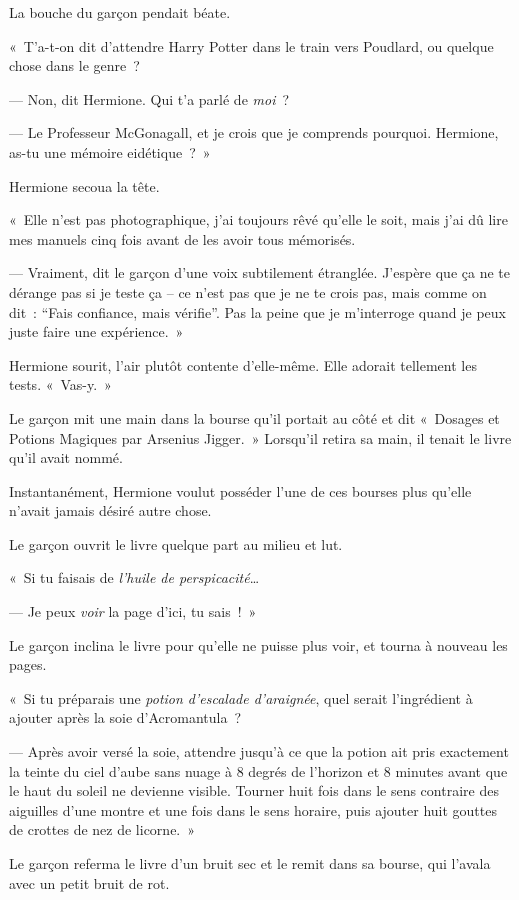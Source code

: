 La bouche du garçon pendait béate.

«~T'a-t-on dit d'attendre Harry Potter dans le train vers Poudlard, ou quelque chose dans le genre~?

--- Non, dit Hermione. Qui t'a parlé de \emph{moi}~?

--- Le Professeur McGonagall, et je crois que je comprends pourquoi. Hermione, as-tu une mémoire eidétique~?~»

Hermione secoua la tête.

«~Elle n'est pas photographique, j'ai toujours rêvé qu'elle le soit, mais j'ai dû lire mes manuels cinq fois avant de les avoir tous mémorisés.

--- Vraiment, dit le garçon d'une voix subtilement étranglée. J'espère que ça ne te dérange pas si je teste ça -- ce n'est pas que je ne te crois pas, mais comme on dit~: “Fais confiance, mais vérifie”. Pas la peine que je m'interroge quand je peux juste faire une expérience.~»

Hermione sourit, l'air plutôt contente d'elle-même. Elle adorait tellement les tests. «~Vas-y.~»

Le garçon mit une main dans la bourse qu'il portait au côté et dit «~Dosages et Potions Magiques par Arsenius Jigger.~» Lorsqu'il retira sa main, il tenait le livre qu'il avait nommé.

Instantanément, Hermione voulut posséder l'une de ces bourses plus qu'elle n'avait jamais désiré autre chose.

Le garçon ouvrit le livre quelque part au milieu et lut.

«~Si tu faisais de \emph{l'huile de perspicacité}…

--- Je peux \emph{voir} la page d'ici, tu sais~!~»

Le garçon inclina le livre pour qu'elle ne puisse plus voir, et tourna à nouveau les pages.

«~Si tu préparais une \emph{potion d'escalade d'araignée}, quel serait l'ingrédient à ajouter après la soie d'Acromantula~?

--- Après avoir versé la soie, attendre jusqu'à ce que la potion ait pris exactement la teinte du ciel d'aube sans nuage à 8 degrés de l'horizon et 8 minutes avant que le haut du soleil ne devienne visible. Tourner huit fois dans le sens contraire des aiguilles d'une montre et une fois dans le sens horaire, puis ajouter huit gouttes de crottes de nez de licorne.~»

Le garçon referma le livre d'un bruit sec et le remit dans sa bourse, qui l'avala avec un petit bruit de rot.

